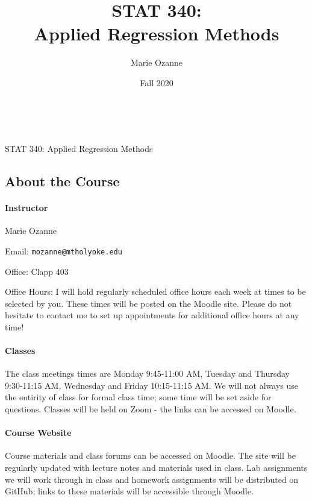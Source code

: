 \documentclass[11pt]{article}
\title{STAT 340:\\Applied Regression Methods}
\author{Marie Ozanne}
\date{Fall 2020}
\begin{document}

\ \\
\vspace{.01in}
\begin{center}
{\large STAT 340: Applied Regression Methods}
\end{center}
\subsection*{About the Course}

\paragraph{Instructor}

Marie Ozanne

Email: \texttt{mozanne@mtholyoke.edu}

Office: Clapp 403

Office Hours: I will hold regularly scheduled office hours each week at times to be selected by you.  These times will be posted on the Moodle site.  Please do not hesitate to contact me to set up appointments for additional office hours at any time!

\paragraph{Classes} \mbox{}
The class meetings times are Monday 9:45-11:00 AM, Tuesday and Thursday 9:30-11:15 AM, Wednesday and Friday 10:15-11:15 AM. We will not always use the entirity of class for formal class time; some time will be set aside for questions. Classes will be held on Zoom - the links can be accessed on Moodle.


\paragraph{Course Website}
Course materials and class forums can be accessed on Moodle. The site will be regularly updated with lecture notes and materials used in class. Lab assignments we will work through in class and homework assignments will be distributed on GitHub; links to these materials will be accessible through Moodle.
\end{document}
